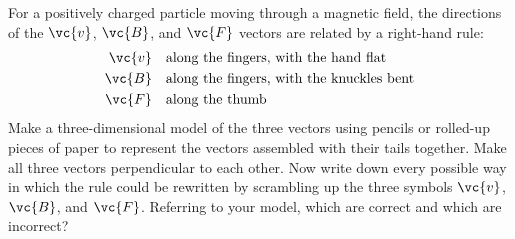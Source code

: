         For a positively charged particle moving through a magnetic field,
        the directions of the $\vc{v}$, $\vc{B}$, and $\vc{F}$ vectors
        are related by a right-hand rule:
        \begin{align*}
                \vc{v}        & \quad \text{along the fingers, with the hand flat}\\
                \vc{B}        & \quad \text{along the fingers, with the knuckles bent}\\
                \vc{F}        & \quad \text{along the thumb}
        \end{align*}
        Make a three-dimensional model of the three vectors using
        pencils or rolled-up pieces of paper to represent the
        vectors assembled with their tails together. Make all three vectors
        perpendicular to each other. Now write down
        every possible way in which the rule could be rewritten by
        scrambling up the three symbols $\vc{v}$, $\vc{B}$, and $\vc{F}$. Referring
        to your model, which are correct and which are incorrect?
